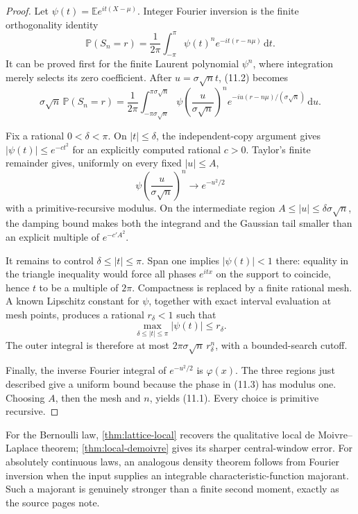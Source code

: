 \documentclass[11pt]{article}
\newcommand{\E}{\mathbb E}
\newcommand{\Pp}{\mathbb P}
\newcommand{\dd}{\,\mathrm d}
\newcommand{\phiN}{\varphi}
\begin{document}
\begin{proof}
Let \(\psi(t)=\E e^{it(X-\mu)}\).  Integer Fourier inversion is the finite
orthogonality identity
\[
 \Pp(S_n=r)=\frac1{2\pi}\int_{-\pi}^{\pi}
    \psi(t)^n e^{-it(r-n\mu)}\dd t.                  \tag{11.2}
\]
It can be proved first for the finite Laurent polynomial \(\psi^n\), where
integration merely selects its zero coefficient.  After \(u=\sigma\sqrt n t\),
(11.2) becomes
\[
 \sigma\sqrt n\,\Pp(S_n=r)
 =\frac1{2\pi}\int_{-\pi\sigma\sqrt n}^{\pi\sigma\sqrt n}
 \psi\!\left(\frac{u}{\sigma\sqrt n}\right)^n
 e^{-iu(r-n\mu)/(\sigma\sqrt n)}\dd u.               \tag{11.3}
\]

Fix a rational \(0<\delta<\pi\).  On \(|t|\le\delta\), the independent-copy
argument gives \(|\psi(t)|\le e^{-ct^2}\) for an explicitly computed rational
\(c>0\).  Taylor's finite remainder gives, uniformly on every fixed
\(|u|\le A\),
\[
 \psi\!\left(\frac{u}{\sigma\sqrt n}\right)^n
 \longrightarrow e^{-u^2/2}                          \tag{11.4}
\]
with a primitive-recursive modulus.  On the intermediate region
\(A\le|u|\le\delta\sigma\sqrt n\), the damping bound makes both the
integrand and the Gaussian tail smaller than an explicit multiple of
\(e^{-c'A^2}\).

It remains to control \(\delta\le|t|\le\pi\).  Span one implies
\(|\psi(t)|<1\) there: equality in the triangle inequality would force all
phases \(e^{itx}\) on the support to coincide, hence \(t\) to be a multiple
of \(2\pi\).  Compactness is replaced by a finite rational mesh.  A known
Lipschitz constant for \(\psi\), together with exact interval evaluation at
mesh points, produces a rational \(r_\delta<1\) such that
\[
 \max_{\delta\le|t|\le\pi}|\psi(t)|\le r_\delta.      \tag{11.5}
\]
The outer integral is therefore at most
\(2\pi\sigma\sqrt n\,r_\delta^n\), with a bounded-search cutoff.

Finally, the inverse Fourier integral of \(e^{-u^2/2}\) is
\(\phiN(x)\).  The three regions just described give a uniform bound because
the phase in (11.3) has modulus one.  Choosing \(A\), then the mesh and
\(n\), yields (11.1).  Every choice is primitive recursive.
\end{proof}

For the Bernoulli law, \cref{thm:lattice-local} recovers the qualitative local
de Moivre--Laplace theorem; \cref{thm:local-demoivre} gives its sharper
central-window error.  For absolutely continuous laws, an analogous density
theorem follows from Fourier inversion when the input supplies an integrable
characteristic-function majorant.  Such a majorant is genuinely stronger
than a finite second moment, exactly as the source pages note.
\end{document}

